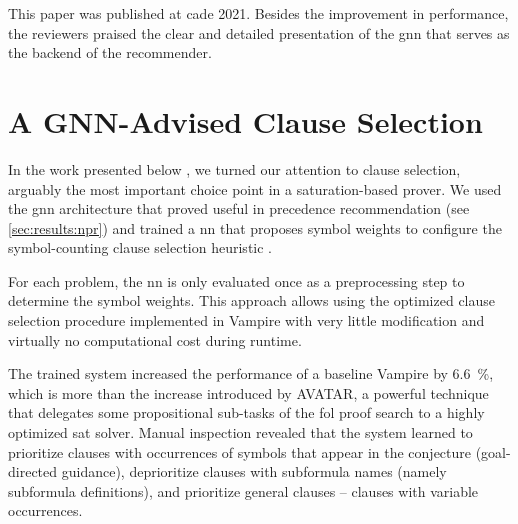 

This paper was published at \gls{cade} 2021.
Besides the improvement in performance,
the reviewers praised the clear and detailed presentation of the \gls{gnn} that serves as the backend of the recommender.


\section{A GNN-Advised Clause Selection}
\label{sec:results:selection}


In the work presented below \cite{DBLP:conf/lpar/Bartek023},
we turned our attention to clause selection,
arguably the most important choice point in a saturation-based prover.
We used the \gls{gnn} architecture
that proved useful in precedence recommendation (see \cref{sec:results:npr})
and trained a \gls{nn} that proposes symbol weights to configure the symbol-counting clause selection heuristic \cite{DBLP:conf/cade/SchulzM16,E-manual}.

For each problem, the \gls{nn} is only evaluated once as a preprocessing step to determine the symbol weights.
This approach allows using the optimized clause selection procedure implemented in Vampire
with very little modification and virtually no computational cost during runtime.

The trained system increased the performance of a baseline Vampire by \SI{6.6}{\percent},
which is more than the increase introduced by AVATAR,
a powerful technique that delegates some propositional sub-tasks of the \gls{fol} proof search to a highly optimized \gls{sat} solver.
Manual inspection revealed that
the system learned to
prioritize clauses with occurrences of symbols that appear in the conjecture (goal-directed guidance),
deprioritize clauses with subformula names (namely subformula definitions),
and prioritize general clauses -- clauses with variable occurrences.

